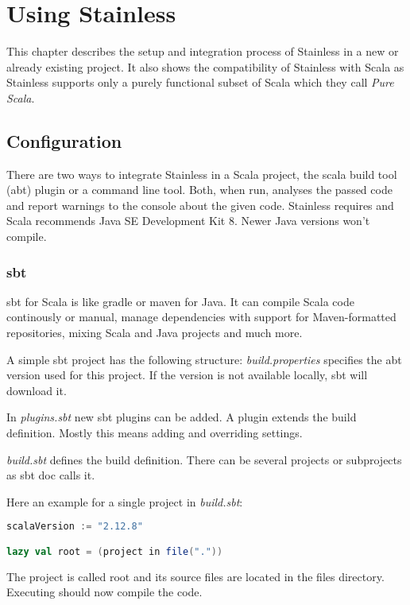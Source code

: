 \chapter{Using Stainless}
\label{chap:using_stainless}
This chapter describes the setup and integration process of Stainless in a new or already existing project.
It also shows the compatibility of Stainless with Scala as Stainless supports only a purely functional subset of Scala which they call \emph{Pure Scala}.

\section{Configuration}
There are two ways to integrate Stainless in a Scala project, the scala build tool (abt) plugin or a command line tool.
Both, when run, analyses the passed code and report warnings to the console about the given code.
Stainless requires and Scala recommends Java SE Development Kit 8.
Newer Java versions won't compile.

\subsection{sbt}
sbt for Scala is like gradle or maven for Java.
It can compile Scala code continously or manual, manage dependencies with support for Maven-formatted repositories, mixing Scala and Java projects and much more.

A simple sbt project has the following structure:
\emph{build.properties} specifies the abt version used for this project.
If the version is not available locally, sbt will download it.

In \emph{plugins.sbt} new sbt plugins can be added.
A plugin extends the build definition.
Mostly this means adding and overriding settings.

\emph{build.sbt} defines the build definition.
There can be several projects or subprojects as sbt doc calls it.

Here an example for a single project in \emph{build.sbt}:
\begin{lstlisting}[language=scala]
scalaVersion := "2.12.8"

lazy val root = (project in file("."))
\end{lstlisting}
The project is called root and its source files are located in the files directory.
Executing  should now compile the code.

